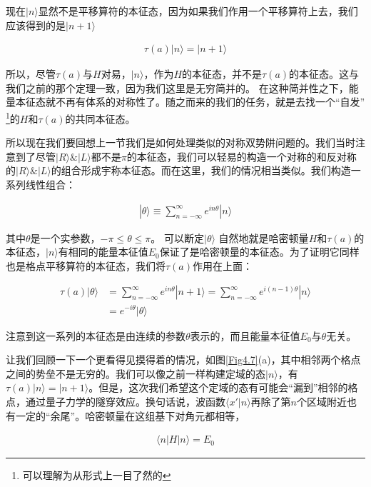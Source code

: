 \documentclass[UTF8,twoside]{ctexart}
\begin{document}
现在$|n\rangle$显然不是平移算符的本征态，因为如果我们作用一个平移算符上去，我们应该得到的是$|n+1\rangle$

\begin{align}
\tau(a)|n\rangle = |n+1\rangle 
\end{align}

\noindent 所以，尽管$\tau(a)$与$H$对易，$|n\rangle$，作为$H$的本征态，并不是$\tau(a)$的本征态。这与我们之前的那个定理一致，因为我们这里是无穷简并的。 在这种简并性之下，能量本征态就不再有体系的对称性了。随之而来的我们的任务，就是去找一个“自发” \footnote[1]{可以理解为从形式上一目了然的}的$H$和$\tau(a)$的共同本征态。

所以现在我们要回想上一节我们是如何处理类似的对称双势阱问题的。我们当时注意到了尽管$|R\rangle \& |L\rangle$都不是$\pi$的本征态，我们可以轻易的构造一个对称的和反对称的$|R\rangle \& |L\rangle$的组合形成宇称本征态。而在这里，我们的情况相当类似。我们构造一系列线性组合：

\begin{align}
|\theta\rangle \equiv \sum_{n = -\infty}^{\infty}e^{in\theta}|n\rangle
\end{align}

\noindent 其中$\theta$是一个实参数，$-\pi \le \theta \le \pi$。 可以断定$|\theta\rangle$ 自然地就是哈密顿量$H$和$\tau(a)$的本征态，$|n\rangle$有相同的能量本征值$E_0$保证了是哈密顿量的本征态。为了证明它同样也是格点平移算符的本征态，我们将$\tau(a)$作用在上面：

\begin{equation} \label{4.3.7}
\begin{split}
\tau(a)|\theta\rangle &= \sum_{n = -\infty}^{\infty} e^{in\theta}|n+1\rangle = \sum_{n = -\infty}^{\infty} e^{i(n-1)\theta}|n\rangle\\
&=e^{-i\theta}|\theta\rangle
\end{split}
\end{equation}

\noindent 注意到这一系列的本征态是由连续的参数$\theta$表示的，而且能量本征值$E_0$与$\theta$无关。

让我们回顾一下一个更看得见摸得着的情况，如图{\ref{Fig4.7}(a)}，其中相邻两个格点之间的势垒不是无穷的。我们可以像之前一样构建定域的态$|n\rangle$，有$\tau(a)|n\rangle = |n+1\rangle$。但是，这次我们希望这个定域的态有可能会“漏到”相邻的格点，通过量子力学的隧穿效应。换句话说，波函数$\langle x'|n\rangle$再除了第$n$个区域附近也有一定的“余尾”。哈密顿量在这组基下对角元都相等，

\begin{align}
\langle n|H|n\rangle = E_0
\end{align}
\end{document}

